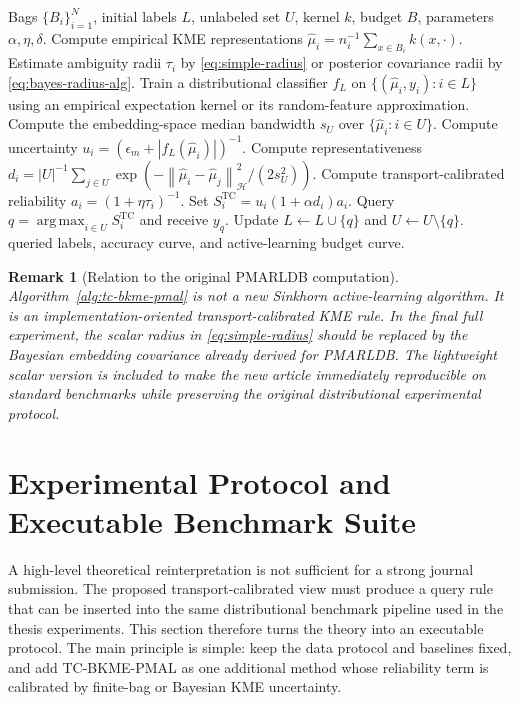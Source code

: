 \documentclass[10pt,journal]{IEEEtran}
\newtheorem{remark}{Remark}
\DeclareMathOperator*{\argmax}{arg\,max}
\newcommand{\Hcal}{\mathcal{H}}
\newcommand{\wh}{\widehat}
\newcommand{\norm}[1]{\left\lVert #1 \right\rVert}
\begin{document}
\begin{algorithm}[t]
\caption{Transport-Calibrated Bayesian KME-PMAL (TC-BKME-PMAL)}
\label{alg:tc-bkme-pmal}
\begin{algorithmic}[1]
\REQUIRE Bags $\{B_i\}_{i=1}^N$, initial labels $L$, unlabeled set $U$, kernel $k$, budget $B$, parameters $\alpha,\eta,\delta$.
\STATE Compute empirical KME representations $\wh\mu_i=n_i^{-1}\sum_{x\in B_i}k(x,\cdot)$.
\STATE Estimate ambiguity radii $\tau_i$ by \eqref{eq:simple-radius} or posterior covariance radii by \eqref{eq:bayes-radius-alg}.
    \STATE Train a distributional classifier $f_L$ on $\{(\wh\mu_i,y_i):i\in L\}$ using an empirical expectation kernel or its random-feature approximation.
    \STATE Compute the embedding-space median bandwidth $s_U$ over $\{\wh\mu_i:i\in U\}$.
        \STATE Compute uncertainty $u_i=(\epsilon_m+|f_L(\wh\mu_i)|)^{-1}$.
        \STATE Compute representativeness $d_i=|U|^{-1}\sum_{j\in U}\exp(-\norm{\wh\mu_i-\wh\mu_j}_{\Hcal}^2/(2s_U^2))$.
        \STATE Compute transport-calibrated reliability $a_i=(1+\eta\tau_i)^{-1}$.
        \STATE Set $S_i^{\mathrm{TC}}=u_i(1+\alpha d_i)a_i$.
    \ENDFOR
    \STATE Query $q=\argmax_{i\in U}S_i^{\mathrm{TC}}$ and receive $y_q$.
    \STATE Update $L\leftarrow L\cup\{q\}$ and $U\leftarrow U\setminus\{q\}$.
\ENDFOR
\RETURN queried labels, accuracy curve, and active-learning budget curve.
\end{algorithmic}
\end{algorithm}

\begin{remark}[Relation to the original PMARLDB computation]
Algorithm~\ref{alg:tc-bkme-pmal} is not a new Sinkhorn active-learning algorithm. It is an implementation-oriented transport-calibrated KME rule. In the final full experiment, the scalar radius in \eqref{eq:simple-radius} should be replaced by the Bayesian embedding covariance already derived for PMARLDB. The lightweight scalar version is included to make the new article immediately reproducible on standard benchmarks while preserving the original distributional experimental protocol.
\end{remark}


\section{Experimental Protocol and Executable Benchmark Suite}
\label{sec:experiments}

A high-level theoretical reinterpretation is not sufficient for a strong journal submission. The proposed transport-calibrated view must produce a query rule that can be inserted into the same distributional benchmark pipeline used in the thesis experiments. This section therefore turns the theory into an executable protocol. The main principle is simple: keep the data protocol and baselines fixed, and add TC-BKME-PMAL as one additional method whose reliability term is calibrated by finite-bag or Bayesian KME uncertainty.
\end{document}

